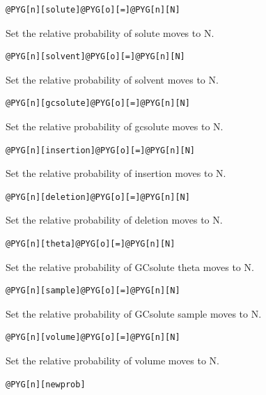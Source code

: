 \documentclass[letterpaper,10pt,english]{manual}
\begin{document}
\begin{Verbatim}[commandchars=@\[\]]
@PYG[n][solute]@PYG[o][=]@PYG[n][N]
\end{Verbatim}

Set the relative probability of solute moves to N.

\begin{Verbatim}[commandchars=@\[\]]
@PYG[n][solvent]@PYG[o][=]@PYG[n][N]
\end{Verbatim}

Set the relative probability of solvent moves to N.

\begin{Verbatim}[commandchars=@\[\]]
@PYG[n][gcsolute]@PYG[o][=]@PYG[n][N]
\end{Verbatim}

Set the relative probability of gcsolute moves to N.

\begin{Verbatim}[commandchars=@\[\]]
@PYG[n][insertion]@PYG[o][=]@PYG[n][N]
\end{Verbatim}

Set the relative probability of insertion moves to N.

\begin{Verbatim}[commandchars=@\[\]]
@PYG[n][deletion]@PYG[o][=]@PYG[n][N]
\end{Verbatim}

Set the relative probability of deletion moves to N.

\begin{Verbatim}[commandchars=@\[\]]
@PYG[n][theta]@PYG[o][=]@PYG[n][N]
\end{Verbatim}

Set the relative probability of GCsolute theta moves to N.

\begin{Verbatim}[commandchars=@\[\]]
@PYG[n][sample]@PYG[o][=]@PYG[n][N]
\end{Verbatim}

Set the relative probability of GCsolute sample moves to N.

\begin{Verbatim}[commandchars=@\[\]]
@PYG[n][volume]@PYG[o][=]@PYG[n][N]
\end{Verbatim}

Set the relative probability of volume moves to N.

\begin{Verbatim}[commandchars=@\[\]]
@PYG[n][newprob]
\end{Verbatim}
\end{document}
